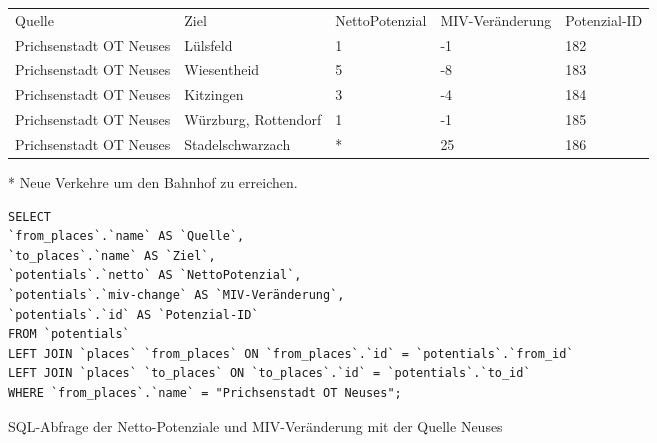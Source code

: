 \begin{tabular}{ l  l  l  l  l }
Quelle & Ziel & NettoPotenzial & MIV-Veränderung & Potenzial-ID\\ 
Prichsenstadt OT Neuses & Lülsfeld & 1 & -1 & 182\\ 
Prichsenstadt OT Neuses & Wiesentheid & 5 & -8 & 183\\ 
Prichsenstadt OT Neuses & Kitzingen & 3 & -4 & 184\\ 
Prichsenstadt OT Neuses & Würzburg, Rottendorf & 1 & -1 & 185\\ 
Prichsenstadt OT Neuses & Stadelschwarzach & * & 25 & 186\\ 
\end{tabular}
\newline
\newline
* Neue Verkehre um den Bahnhof zu erreichen.
\newline
\begin{listing}[htbp]
\begin{verbatim}
SELECT
`from_places`.`name` AS `Quelle`, 
`to_places`.`name` AS `Ziel`, 
`potentials`.`netto` AS `NettoPotenzial`, 
`potentials`.`miv-change` AS `MIV-Veränderung`, 
`potentials`.`id` AS `Potenzial-ID`
FROM `potentials`
LEFT JOIN `places` `from_places` ON `from_places`.`id` = `potentials`.`from_id`
LEFT JOIN `places` `to_places` ON `to_places`.`id` = `potentials`.`to_id`
WHERE `from_places`.`name` = "Prichsenstadt OT Neuses";
\end{verbatim}
\caption{SQL-Abfrage der Netto-Potenziale und MIV-Veränderung mit der Quelle Neuses}\label{lst-fz-neuses}
\end{listing}